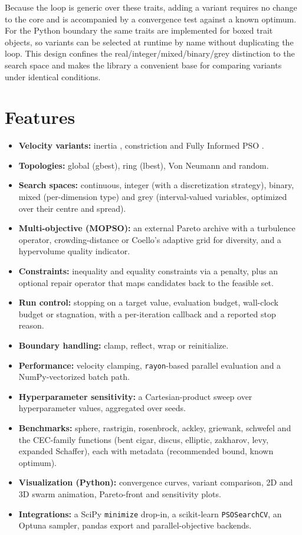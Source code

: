 \documentclass[11pt]{article}
\begin{document}
Because the loop is generic over these traits, adding a variant requires no
change to the core and is accompanied by a convergence test against a known
optimum. For the Python boundary the same traits are implemented for boxed trait
objects, so variants can be selected at runtime by name without duplicating the
loop. This design confines the real/integer/mixed/binary/grey distinction to the
search space and makes the library a convenient base for comparing variants
under identical conditions.

\section{Features}

\begin{itemize}
  \item \textbf{Velocity variants:} inertia \citep{shi1998modified},
  constriction \citep{clerc2002particle} and Fully Informed PSO
  \citep{mendes2004fully}.
  \item \textbf{Topologies:} global (gbest), ring (lbest), Von Neumann and
  random.
  \item \textbf{Search spaces:} continuous, integer (with a discretization
  strategy), binary, mixed (per-dimension type) and grey (interval-valued
  variables, optimized over their centre and spread).
  \item \textbf{Multi-objective (MOPSO):} an external Pareto archive with a
  turbulence operator, crowding-distance or Coello's adaptive grid
  \citep{coello2004handling} for diversity, and a hypervolume quality indicator.
  \item \textbf{Constraints:} inequality and equality constraints via a penalty,
  plus an optional repair operator that maps candidates back to the feasible set.
  \item \textbf{Run control:} stopping on a target value, evaluation budget,
  wall-clock budget or stagnation, with a per-iteration callback and a reported
  stop reason.
  \item \textbf{Boundary handling:} clamp, reflect, wrap or reinitialize.
  \item \textbf{Performance:} velocity clamping, \texttt{rayon}-based parallel
  evaluation and a NumPy-vectorized batch path.
  \item \textbf{Hyperparameter sensitivity:} a Cartesian-product sweep over
  hyperparameter values, aggregated over seeds.
  \item \textbf{Benchmarks:} sphere, rastrigin, rosenbrock, ackley, griewank,
  schwefel and the CEC-family functions (bent cigar, discus, elliptic, zakharov,
  levy, expanded Schaffer), each with metadata (recommended bound, known
  optimum).
  \item \textbf{Visualization (Python):} convergence curves, variant comparison,
  2D and 3D swarm animation, Pareto-front and sensitivity plots.
  \item \textbf{Integrations:} a SciPy \texttt{minimize} drop-in, a
  scikit-learn \texttt{PSOSearchCV}, an Optuna sampler, pandas export and
  parallel-objective backends.
\end{itemize}
\end{document}
